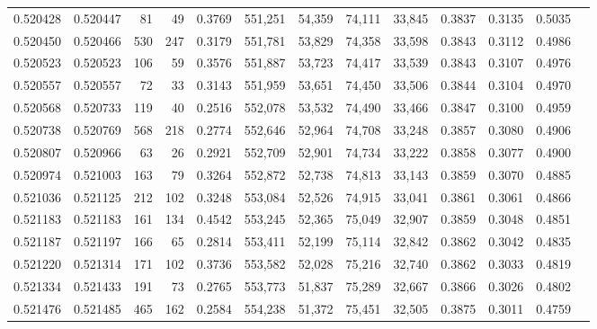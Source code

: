 \begin{tabular}{rrrrrrrrrrrrr}
0.520428 & 0.520447 &    81 &    49 &                                     0.3769 & 551,251 &  54,359 &  74,111 &  33,845 & 0.3837 & 0.3135 & 0.5035 \\
0.520450 & 0.520466 &   530 &   247 &                                     0.3179 & 551,781 &  53,829 &  74,358 &  33,598 & 0.3843 & 0.3112 & 0.4986 \\
0.520523 & 0.520523 &   106 &    59 &                                     0.3576 & 551,887 &  53,723 &  74,417 &  33,539 & 0.3843 & 0.3107 & 0.4976 \\
0.520557 & 0.520557 &    72 &    33 &                                     0.3143 & 551,959 &  53,651 &  74,450 &  33,506 & 0.3844 & 0.3104 & 0.4970 \\
0.520568 & 0.520733 &   119 &    40 &                                     0.2516 & 552,078 &  53,532 &  74,490 &  33,466 & 0.3847 & 0.3100 & 0.4959 \\
0.520738 & 0.520769 &   568 &   218 &                                     0.2774 & 552,646 &  52,964 &  74,708 &  33,248 & 0.3857 & 0.3080 & 0.4906 \\
0.520807 & 0.520966 &    63 &    26 &                                     0.2921 & 552,709 &  52,901 &  74,734 &  33,222 & 0.3858 & 0.3077 & 0.4900 \\
0.520974 & 0.521003 &   163 &    79 &                                     0.3264 & 552,872 &  52,738 &  74,813 &  33,143 & 0.3859 & 0.3070 & 0.4885 \\
0.521036 & 0.521125 &   212 &   102 &                                     0.3248 & 553,084 &  52,526 &  74,915 &  33,041 & 0.3861 & 0.3061 & 0.4866 \\
0.521183 & 0.521183 &   161 &   134 &                                     0.4542 & 553,245 &  52,365 &  75,049 &  32,907 & 0.3859 & 0.3048 & 0.4851 \\
0.521187 & 0.521197 &   166 &    65 &                                     0.2814 & 553,411 &  52,199 &  75,114 &  32,842 & 0.3862 & 0.3042 & 0.4835 \\
0.521220 & 0.521314 &   171 &   102 &                                     0.3736 & 553,582 &  52,028 &  75,216 &  32,740 & 0.3862 & 0.3033 & 0.4819 \\
0.521334 & 0.521433 &   191 &    73 &                                     0.2765 & 553,773 &  51,837 &  75,289 &  32,667 & 0.3866 & 0.3026 & 0.4802 \\
0.521476 & 0.521485 &   465 &   162 &                                     0.2584 & 554,238 &  51,372 &  75,451 &  32,505 & 0.3875 & 0.3011 & 0.4759 \\

\end{tabular}
